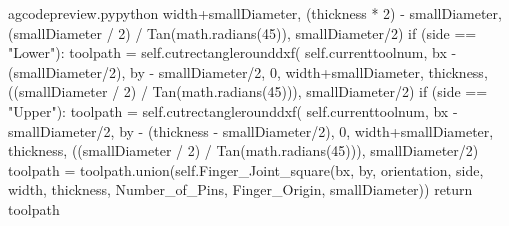 \documentclass{ltxdoc}
\begin{document}
\begin{writecode}{a}{gcodepreview.py}{python}
                    width+smallDiameter, 
                    (thickness * 2) - smallDiameter, 
                    (smallDiameter / 2) / Tan(math.radians(45)), 
                    smallDiameter/2)
            if (side == "Lower"):
                toolpath = self.cutrectanglerounddxf(
                    self.currenttoolnum, 
                    bx - (smallDiameter/2), 
                    by - smallDiameter/2, 
                    0, 
                    width+smallDiameter, 
                    thickness, 
                    ((smallDiameter / 2) / Tan(math.radians(45))), 
                    smallDiameter/2)
            if (side == "Upper"):
                toolpath = self.cutrectanglerounddxf(
                    self.currenttoolnum, 
                    bx - smallDiameter/2, 
                    by - (thickness - smallDiameter/2), 
                    0, 
                    width+smallDiameter, 
                    thickness, 
                    ((smallDiameter / 2) / Tan(math.radians(45))), 
                    smallDiameter/2)
        toolpath = toolpath.union(self.Finger_Joint_square(bx, by, orientation, side, width, thickness, Number_of_Pins, Finger_Origin, smallDiameter))
        return toolpath


\end{writecode}
\end{document}
